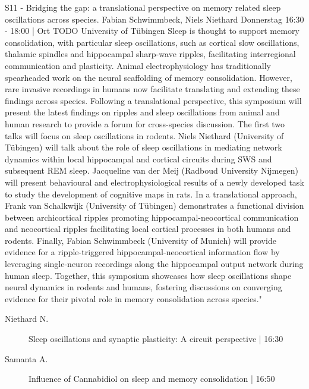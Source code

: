 
            \begin{symposium}
            {S11 - Bridging the gap: a translational perspective on memory related sleep oscillations across species.}
            {Fabian Schwimmbeck, Niels Niethard }
            {Donnerstag 16:30 - 18:00 | Ort TODO}
            {University of Tübingen}
            Sleep is thought to support memory consolidation, with particular sleep oscillations, such as cortical slow oscillations, thalamic spindles and hippocampal sharp-wave ripples, facilitating interregional communication and plasticity. Animal electrophysiology has traditionally spearheaded work on the neural scaffolding of memory consolidation. However, rare invasive recordings in humans now facilitate translating and extending these findings across species.
Following a translational perspective, this symposium will present the latest findings on ripples and sleep oscillations from animal and human research to provide a forum for cross-species discussion.
The first two talks will focus on sleep oscillations in rodents. Niels Niethard (University of Tübingen) will talk about the role of sleep oscillations in mediating network dynamics within local hippocampal and cortical circuits during SWS and subsequent REM sleep.
Jacqueline van der Meij (Radboud University Nijmegen) will present behavioural and electrophysiological results of a newly developed task to study the development of cognitive maps in rats.
In a translational approach, Frank van Schalkwijk (University of Tübingen) demonstrates a functional division between archicortical ripples promoting hippocampal-neocortical communication and neocortical ripples facilitating local cortical processes in both humans and rodents.
Finally, Fabian Schwimmbeck (University of Munich) will provide evidence for a ripple-triggered hippocampal-neocortical information flow by leveraging single-neuron recordings along the hippocampal output network during human sleep.
Together, this symposium showcases how sleep oscillations shape neural dynamics in rodents and humans, fostering discussions on converging evidence for their pivotal role in memory consolidation across species."
            \begin{description}    
            
                \item [ Niethard N.] Sleep oscillations and synaptic plasticity: A circuit perspective \textcolor{mygray}{ | 16:30}    
                
                \item [ Samanta A.] Influence of Cannabidiol on sleep and memory consolidation \textcolor{mygray}{ | 16:50}    
                

\end{description}
\end{symposium}

